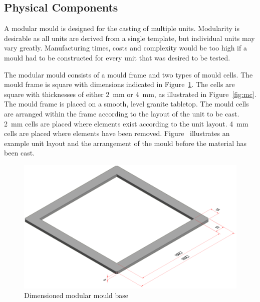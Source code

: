 \subsection{Physical Components}

A modular mould is designed for the casting of multiple units. Modularity is desirable as all units are derived from a single template, but individual units may vary greatly. Manufacturing times, costs and complexity would be too high if a mould had to be constructed for every unit that was desired to be tested.

The modular mould consists of a mould frame and two types of mould cells. The mould frame is square with dimensions indicated in Figure~\ref{fig:mb}. The cells are square with thicknesses of either \SI{2}{mm} or \SI{4}{mm}, as illustrated in Figure~\ref{fig:mc}. The mould frame is placed on a smooth, level granite tabletop. The mould cells are arranged within the frame according to the layout of the unit to be cast. \SI{2}{mm} cells are placed where elements exist according to the unit layout. \SI{4}{mm} cells are placed where elements have been removed. Figure~ illustrates an example unit layout and the arrangement of the mould before the material has been cast.

\begin{figure}[H]
	\centering
	\includegraphics[width=\textwidth]{MB.png}
	\caption{Dimensioned modular mould base}
	\label{fig:mb}
\end{figure}


